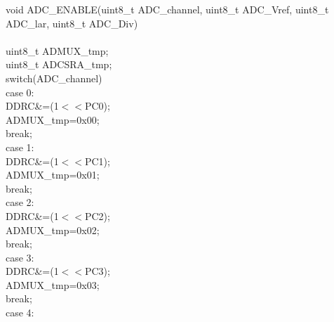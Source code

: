 \documentclass[titlepage, a4paper, 10pt, reqno, openany]{report}
\begin{document}
\vline \quad
\begin{minipage}[t]{.3\linewidth}
\tiny
void ADC\_ENABLE(uint8\_t ADC\_channel, uint8\_t ADC\_Vref, uint8\_t ADC\_lar, uint8\_t ADC\_Div) \\
\textbraceleft \\
\hspace*{.5cm}	uint8\_t ADMUX\_tmp; \\
\hspace*{.5cm}	uint8\_t ADCSRA\_tmp; \\
\hspace*{.5cm}	switch(ADC\_channel)\textbraceleft \\
\hspace*{1cm}		case 0: \\
\hspace*{1.5cm}			DDRC\&=\texttildelow (1$<<$PC0); \\
\hspace*{1.5cm}			ADMUX\_tmp=0x00; \\
\hspace*{1.5cm}			break; \\
\hspace*{1cm}		case 1: \\
\hspace*{1.5cm}			DDRC\&=\texttildelow (1$<<$PC1); \\
\hspace*{1.5cm}			ADMUX\_tmp=0x01; \\
\hspace*{1.5cm}			break; \\
\hspace*{1cm}		case 2: \\
\hspace*{1.5cm}			DDRC\&=\texttildelow (1$<<$PC2); \\
\hspace*{1.5cm}			ADMUX\_tmp=0x02; \\
\hspace*{1.5cm}			break; \\
\hspace*{1cm}		case 3: \\
\hspace*{1.5cm}			DDRC\&=\texttildelow (1$<<$PC3); \\
\hspace*{1.5cm}			ADMUX\_tmp=0x03; \\
\hspace*{1.5cm}			break; \\
\hspace*{1cm}		case 4: \\

\end{minipage}
\end{document}
